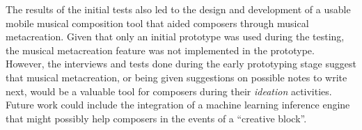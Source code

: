 		The results of the initial tests also led to the design and development of a usable mobile musical composition tool that aided composers through musical metacreation. Given that only an initial prototype was used during the testing, the musical metacreation feature was not implemented in the prototype. However, the interviews and tests done during the early prototyping stage suggest that musical metacreation, or being given suggestions on possible notes to write next, would be a valuable tool for composers during their \textit{ideation} activities. Future work could include the integration of a machine learning inference engine that might possibly help composers in the events of a ``creative block''.




